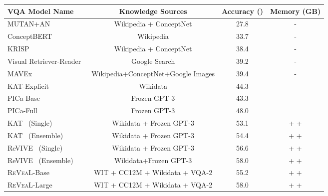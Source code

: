 \documentclass[10pt,twocolumn,letterpaper]{article}
\newcommand{\method}{R\textsc{e}V\textsc{ea}L\xspace}
\begin{document}
\begin{table*}[t!]
\centering
\small
    \vspace{-.4in}
\begin{tabular}{l|c|c|c} \toprule
\textbf{VQA Model Name}    &  \textbf{Knowledge Sources} & \textbf{Accuracy ()} & \textbf{Memory (GB)} \\  \midrule
 MUTAN+AN~\cite{DBLP:conf/cvpr/MarinoRFM19}   & Wikipedia + ConceptNet          & 27.8 & -   \\ 
ConceptBERT~\cite{DBLP:conf/emnlp/GarderesZAL20}   &  Wikipedia          & 33.7 & -   \\
 KRISP~\cite{DBLP:conf/cvpr/MarinoCP0R21}   &  Wikipedia + ConceptNet         & 38.4 & -   \\
 Visual Retriever-Reader~\cite{DBLP:conf/emnlp/LuoZBB21}   &  Google Search          & 39.2 & -    \\
 MAVEx~\cite{DBLP:conf/aaai/WuLSM22}   &  Wikipedia+ConceptNet+Google Images          & 39.4 & -   \\
 KAT-Explicit~\cite{DBLP:conf/naacl/GuiWH0BG22}   &  Wikidata     & 44.3 & \color{green}{1.5} \\
 \midrule
PICa-Base~\cite{DBLP:journals/corr/abs-2109-05014}   & Frozen GPT-3     & 43.3 & \color{blue}{350}   \\ 
PICa-Full~\cite{DBLP:journals/corr/abs-2109-05014}     &  Frozen GPT-3          & 48.0 & \color{blue}{350}    \\
KAT~\cite{DBLP:conf/naacl/GuiWH0BG22} (Single)   &  Wikidata + Frozen GPT-3        & 53.1 & \color{green}{1.5} + \color{blue}{352}+ \color{red}{500}   \\
KAT~\cite{DBLP:conf/naacl/GuiWH0BG22}  (Ensemble)   &  Wikidata + Frozen GPT-3         & 54.4 & \color{green}{4.6} + \color{blue}{352} + \color{red}{500}   \\
ReVIVE~\cite{DBLP:journals/corr/abs-2206-01201} (Single)   &  Wikidata + Frozen GPT-3       & 56.6 & \color{green}{1.5} + \color{blue}{354} + \color{red}{500}   \\ 
ReVIVE~\cite{DBLP:journals/corr/abs-2206-01201} (Ensemble)   &  Wikidata+Frozen GPT-3        & 58.0 & \color{green}{4.6} + \color{blue}{354} + \color{red}{500}\\ \midrule
\method-Base   &  WIT + CC12M + Wikidata + VQA-2      & 55.2 & \color{green}{0.8} + \color{blue}{7.5} + \color{red}{744}  \\
\method-Large   &  WIT + CC12M + Wikidata + VQA-2      & 58.0 & \color{green}{2.8} + \color{blue}{10} + \color{red}{993}  \\

\end{tabular}
\end{table*}
\end{document}
